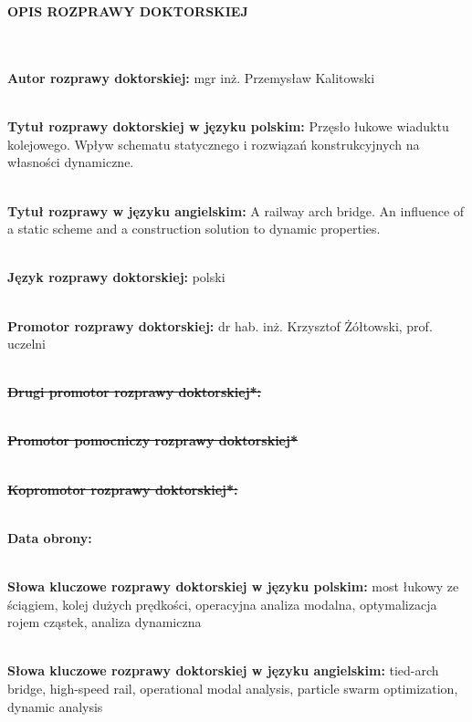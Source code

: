 \begin{figure}
	 \hfill
	
\end{figure}


\begin{myfont}
	
	\noindent
	\\ \\	
	\textbf{OPIS ROZPRAWY DOKTORSKIEJ}
	
	\footnotesize \noindent
	\\ \\
	\textbf{Autor rozprawy doktorskiej:} mgr inż. Przemysław Kalitowski
	
	\noindent
	\\
	\textbf{Tytuł rozprawy doktorskiej w języku polskim:} Przęsło łukowe wiaduktu kolejowego. Wpływ schematu statycznego i rozwiązań konstrukcyjnych na własności dynamiczne.
	
	\noindent
	\\
	\textbf{Tytuł rozprawy w języku angielskim:} A railway arch bridge. An influence of a static scheme and a construction solution to dynamic properties.
	
	\noindent
	\\
	\textbf{Język rozprawy doktorskiej:} polski
	
	\noindent
	\\
	\textbf{Promotor rozprawy doktorskiej:} dr hab. inż. Krzysztof Żółtowski, prof. uczelni
	
	\noindent
	\\
	{\bfseries \sout{Drugi promotor rozprawy doktorskiej*:}}
	
	\noindent
	\\
	{\bfseries \sout{Promotor pomocniczy rozprawy doktorskiej*}}
	
	\noindent
	\\
	{\bfseries \sout{Kopromotor rozprawy doktorskiej*:}}
	
	\noindent
	\\
	\textbf{Data obrony:}
	
	\noindent
	\\
	\textbf{Słowa kluczowe rozprawy doktorskiej w języku polskim:} most łukowy ze ściągiem, kolej dużych prędkości, operacyjna analiza modalna, optymalizacja rojem cząstek, analiza dynamiczna
	
	\noindent
	\\
	\textbf{Słowa kluczowe rozprawy doktorskiej w języku angielskim:} tied-arch bridge, high-speed rail, operational modal analysis, particle swarm optimization, dynamic analysis 
	\vfill
	

\end{myfont}
